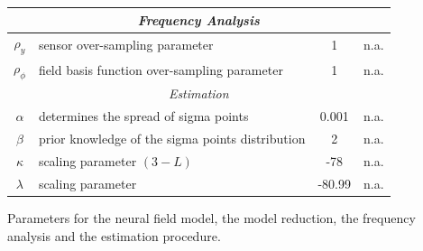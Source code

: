 \documentclass[12pt]{iopart}
\begin{document}
\begin{table}[!ht]
\begin{tabular}{|c|l|c|l|}
	\multicolumn{4}{|c|}{\emph{Frequency Analysis}}\\
	\hline
	$\rho_y$ & sensor over-sampling parameter & 1 & n.a.\\
	$\rho_\phi$ & field basis function over-sampling parameter & 1 & n.a.\\
	\hline 
	\multicolumn{4}{|c|}{\emph{Estimation}}\\
	\hline
	$\alpha$& determines the spread of sigma points & 0.001 & n.a.\\
	$\beta$& prior knowledge of the sigma points distribution & 2 & n.a.\\
	$\kappa$& scaling parameter $(3-L)$& -78 & n.a.\\
	$\lambda$& scaling parameter & -80.99 & n.a.\\
	\hline
\end{tabular}
\begin{flushleft}Parameters for the neural field model, the model reduction, the frequency analysis and the estimation procedure.
\end{flushleft}
\label{tab:Parameters}
\end{table}
	

\end{document}
